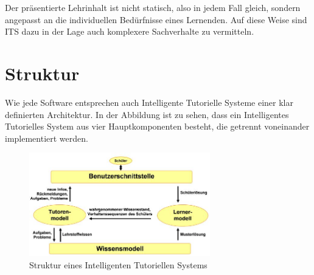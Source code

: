 Der präsentierte Lehrinhalt ist nicht statisch, also in jedem Fall gleich, sondern
angepasst an die individuellen Bedürfnisse eines Lernenden.
Auf diese Weise sind ITS dazu in der Lage auch komplexere Sachverhalte zu vermitteln.

\section{Struktur}
Wie jede Software entsprechen auch Intelligente Tutorielle Systeme einer klar definierten Architektur.
In der Abbildung ist zu sehen, dass ein Intelligentes Tutorielles System aus vier
Hauptkomponenten besteht, die getrennt voneinander implementiert werden.

\begin{figure}[!htb]
	\centering
    \includegraphics[width=0.7\textwidth]{bilder/its_structure.jpg} %
	\caption{Struktur eines Intelligenten Tutoriellen Systems}
\end{figure}


